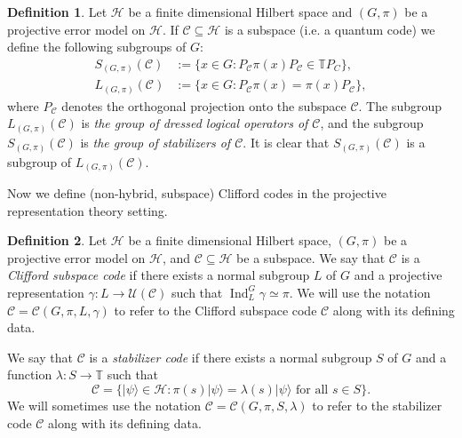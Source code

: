 \documentclass[11pt]{article}
\theoremstyle{definition}
\newtheorem{definition}{Definition}
\def\ket#1{| #1 \rangle}
\newcommand{\bbT}{\mathbb{T}}
\newcommand{\calC}{\mathcal{C}}
\newcommand{\calH}{\mathcal{H}}
\newcommand{\calU}{\mathcal{U}}
\newcommand{\Ind}{\operatorname{Ind}}
\begin{document}
\begin{definition}\label{def:stabilizer and logical group of a code}
    Let $\calH$ be a finite dimensional Hilbert space and $(G,\pi)$ be a projective error model on $\calH$. If $\calC \subseteq \calH$ is a subspace (i.e. a quantum code) we define the following subgroups of $G$:
    \begin{align*}
        S_{(G,\pi)}(\calC) & := \{ x \in G : P_\calC \pi(x)P_\calC \in \bbT P_C \}, \\
        L_{(G,\pi)}(\calC) & := \{ x \in G : P_\calC \pi(x) = \pi(x) P_\calC\},
    \end{align*}
    where $P_\calC$ denotes the orthogonal projection onto the subspace $\calC$. The subgroup $L_{(G,\pi)}(\calC)$ is \emph{the group of dressed logical operators of $\calC$}, and the subgroup $S_{(G,\pi)}(\calC)$ is \emph{the group of stabilizers of $\calC$}. It is clear that $S_{(G,\pi)}(\calC)$ is a subgroup of $L_{(G,\pi)}(\calC)$.
\end{definition}

Now we define (non-hybrid, subspace) Clifford codes in the projective representation theory setting. 

\begin{definition}\label{def:Stabilizer code and Clifford code}
    Let $\calH$ be a finite dimensional Hilbert space, $(G,\pi)$ be a projective error model on $\calH$, and $\calC \subseteq \calH$ be a subspace. We say that $\calC$ is a \emph{Clifford subspace code} if there exists a normal subgroup $L$ of $G$ and a projective representation $\gamma \colon L \to \calU(\calC)$ such that $\Ind_L^G\gamma \simeq \pi$. We will use the notation $\calC = \calC (G,\pi, L, \gamma)$ to refer to the Clifford subspace code $\calC$ along with its defining data.

    We say that $\calC$ is a \emph{stabilizer code} if there exists a normal subgroup $S$ of $G$ and a function $\lambda \colon S \to \bbT$ such that
    \begin{equation*}
        \calC = \{ \ket{\psi} \in \calH : \pi(s)\ket{\psi} = \lambda(s)\ket{\psi} \text{ for all } s \in S \}.
    \end{equation*}
    We will sometimes use the notation $\calC = \calC(G,\pi,S,\lambda)$ to refer to the stabilizer code $\calC$ along with its defining data.
\end{definition}
\end{document}
